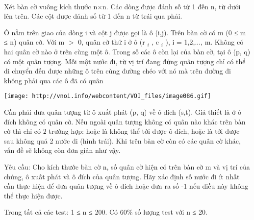  

Xét bàn cờ vuông kích thước n×n. Các dòng được đánh số từ 1 đến n, từ dưới lên trên. Các cột được đánh số từ 1 đến n từ trái qua phải.

Ô nằm trên giao của dòng i và cột j được gọi là ô (i,j). Trên bàn cờ có m (0 ≤ m ≤ n) quân cờ. Với m $>$ 0, quân cờ thứ i ở ô (r $_ i $ , c $_ i $ ), i = 1,2,..., m. Không có hai quân cờ nào ở trên cùng một ô. Trong số các ô còn lại của bàn cờ, tại ô (p, q) có một quân tượng. Mỗi một nước đi, từ vị trí đang đứng quân tượng chỉ có thể di chuyển đến được những ô trên cùng đường chéo với nó mà trên đường đi không phải qua các ô đã có quân


\texttt{[image: http://vnoi.info/webcontent/VOI\_files/image086.gif]}

Cần phải đưa quân tượng từ ô xuất phát (p, q) về ô đích (s,t). Giả thiết là ở ô đích không có quân cờ. Nếu ngoài quân tượng không có quân nào khác trên bàn cờ thì chỉ có 2 trường hợp: hoặc là không thể tới được ô đích, hoặc là tới được sau không quá 2 nước đi (hình trái). Khi trên bàn cờ còn có các quân cờ khác, vấn đề sẽ không còn đơn giản như vậy.

Yêu cầu: Cho kích thước bàn cờ n, số quân cờ hiện có trên bàn cờ m và vị trí của chúng, ô xuất phát và ô đích của quân tượng. Hãy xác định số nước đi ít nhất cần thực hiện để đưa quân tượng về ô đích hoặc đưa ra số -1 nếu điều này không thể thực hiện được.

Trong tất cả các test: 1 ≤ n ≤ 200. Có 60\% số lượng test với n ≤ 20.